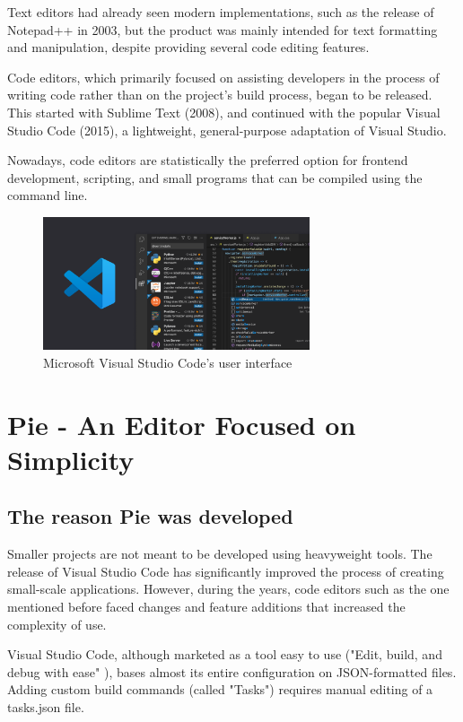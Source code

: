 Text editors had already seen modern implementations, such as the release of Notepad++ in 2003, but the product was mainly intended for text formatting and manipulation, despite providing several code editing features.

Code editors, which primarily focused on assisting developers in the process of writing code rather than on the project's build process, began to be released. This started with Sublime Text (2008), and continued with the popular Visual Studio Code (2015), a lightweight, general-purpose adaptation of Visual Studio.

Nowadays, code editors are statistically the preferred option for frontend development, scripting, and small programs that can be compiled using the command line.

\begin{figure}[h]
\centering
\includegraphics[width=0.7\textwidth]{images/vscode.png}
\caption{Microsoft Visual Studio Code's user interface}
\label{fig:fig2,1.}
\end{figure}

\section{Pie - An Editor Focused on Simplicity}

\subsection{The reason Pie was developed}

Smaller projects are not meant to be developed using heavyweight tools. The release of Visual Studio Code has significantly improved the process of creating small-scale applications. However, during the years, code editors such as the one mentioned before faced changes and feature additions that increased the complexity of use.

Visual Studio Code, although marketed as a tool easy to use ("Edit, build, and debug with ease" \cite{why_vscode}), bases almost its entire configuration on JSON-formatted files. Adding custom build commands (called "Tasks") requires manual editing of a tasks.json file.

